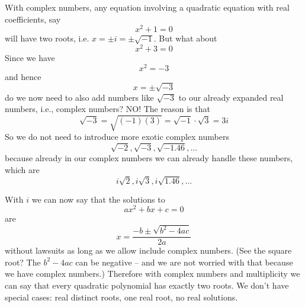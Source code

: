With complex numbers, any equation involving a quadratic equation
with real coefficients, say 
\[
x^2 + 1 = 0
\] 
will have two roots, i.e. $x = \pm i = \pm \sqrt{-1}$.
But what about
\[
x^2 + 3 = 0
\]
Since we have
\[
x^2 = -3
\]
and hence
\[
x = \pm \sqrt{-3}
\]
do we now need to also add numbers like $\sqrt{-3}$ to our already
expanded real numbers, i.e., complex numbers?
NO! The reason is that
\[
\sqrt{-3} = \sqrt{(-1)(3)} = \sqrt{-1} \cdot \sqrt{3} = 3i
\]
So we do not need to introduce more exotic complex numbers 
\[
\sqrt{-2}, \sqrt{-3}, \sqrt{-1.46}, \ldots
\]
because already in our
complex numbers we can already handle these numbers, which are  
\[
i\sqrt{2}, i\sqrt{3}, i\sqrt{1.46}, \ldots
\]

With $i$ we can now say that the solutions to
\[
ax^2 + bx + c = 0
\]
are
\[
x = \frac{-b \pm \sqrt{b^2 - 4ac}}{2a}
\]
without lawsuits as long as we allow include complex numbers.
(See the square root? The $b^2 - 4ac$ can be negative -- and we
are not worried with that because we have complex numbers.)
Therefore with complex numbers and multiplicity we can say that
every quadratic polynomial has exactly two roots.
We don't have special cases: real distinct roots, one real root, no real
solutions.

